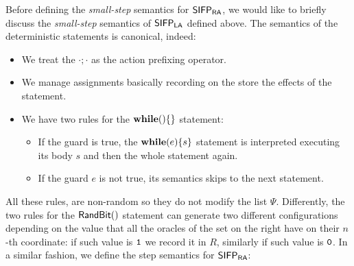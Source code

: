 %
Before defining the \emph{small-step} semantics for $\mathsf{SIFP_{{\mathsf{RA}}}}$,
we would like to briefly discuss the
\emph{small-step} semantics of $\mathsf{SIFP_{{\mathsf{LA}}}}$ defined above.
The semantics of the deterministic statements
is canonical, indeed:
\begin{itemize}
  \item We treat the $\cdot;\cdot$ as the action prefixing operator.
  \item We manage assignments basically recording on the store the effects of the statement.
  \item We have two rules for the $\mathbf{while}()\{\}$ statement:
  \begin{itemize}
    \item If the guard is true, the $\mathbf{while}(e)\{s\}$ statement
    is interpreted executing its body $s$ and then the
    whole statement again.
    \item If the guard $e$ is not true,
    its semantics skips to the next statement.
  \end{itemize}
\end{itemize}
%
All these rules, are non-random so they do not modify the list $\Psi$. Differently, the
two rules for the $\mathsf{RandBit()}$ statement can generate two different configurations depending
on the value that all the oracles of the set on the right have on their $n$-th
coordinate: if such value is $\mathtt{1}$ we record it in $R$,
similarly if such value is $\mathtt{0}$.
%
\noindent
In a similar fashion, we define the step semantics for $\mathsf{SIFP_{{\mathsf{RA}}}}$:


